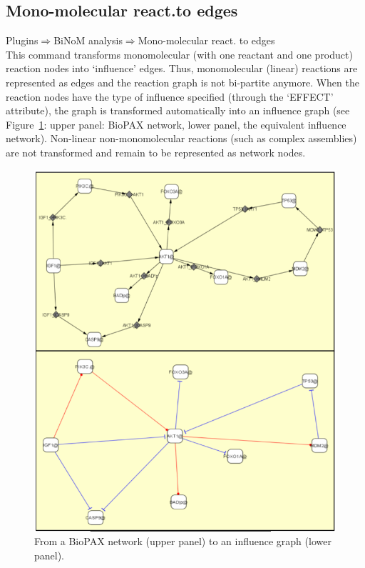 \subsection{Mono-molecular react.to edges}
Plugins$\Rightarrow$BiNoM analysis$\Rightarrow$Mono-molecular react. to edges\\
This command transforms monomolecular (with one reactant and one product) reaction nodes into ‘influence’ edges. Thus, monomolecular (linear) reactions are represented as edges and the reaction graph is not bi-partite anymore. When the reaction nodes have the type of influence specified (through the ‘EFFECT’ attribute), the graph is transformed automatically into an influence graph (see Figure~\ref{Network_to_influence_graph}: upper panel: BioPAX network, lower panel, the equivalent influence network). Non-linear non-monomolecular reactions (such as complex assemblies) are not transformed and remain to be represented as network nodes.
\begin{figure}
\centering
\includegraphics[width=14 cm]{graphics/Network_to_influence_graph}
\caption{From a BioPAX network (upper panel) to an influence graph (lower panel).}
\label{Network_to_influence_graph}
\end{figure}
